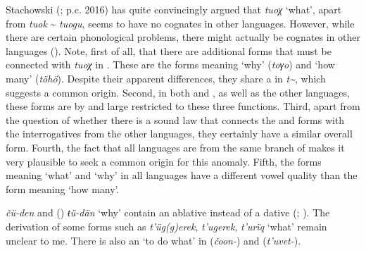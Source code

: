 Stachowski (\citeyear{Stachowski1990,Stachowski2015}; p.c. 2016) has quite convincingly argued that  \textit{tuoχ} ‘what’, apart from  \textit{tuok} {\textasciitilde} \textit{tuogu}, seems to have no cognates in other  languages. However, while there are certain phonological problems, there might actually be cognates in other  languages (). Note, first of all, that there are additional forms that must be connected with \textit{tuoχ} in . These are the forms meaning ‘why’ (\textit{toγo}) and ‘how many’ (\textit{töhö}). Despite their apparent differences, they share a  in \textit{t{\textasciitilde}}, which suggests a common origin. Second, in both  and , as well as the other  languages, these forms are by and large restricted to these three functions. Third, apart from the question of whether there is a sound law that connects the  and  forms with the interrogatives from the other languages, they certainly have a similar overall form. Fourth, the fact that all languages are from the same branch of  makes it very plausible to seek a common origin for this anomaly. Fifth, the forms meaning ‘what’ and ‘why’ in all languages have a different vowel quality than the form meaning ‘how many’.

 \textit{čü-den} and  () \textit{ŧü-dän} ‘why’ contain an ablative instead of a dative (\citealt[28]{AndersonHarrison1999}; \citealt[163]{Castrén1857b}). The derivation of some forms such as  \textit{t’üg(g)erek}, \textit{t’ugerek}, \textit{t’urïq} ‘what’ remain unclear to me. There is also an  ‘to do what’ in  (\textit{čoon-}) and  (\textit{t’uvet-}).

